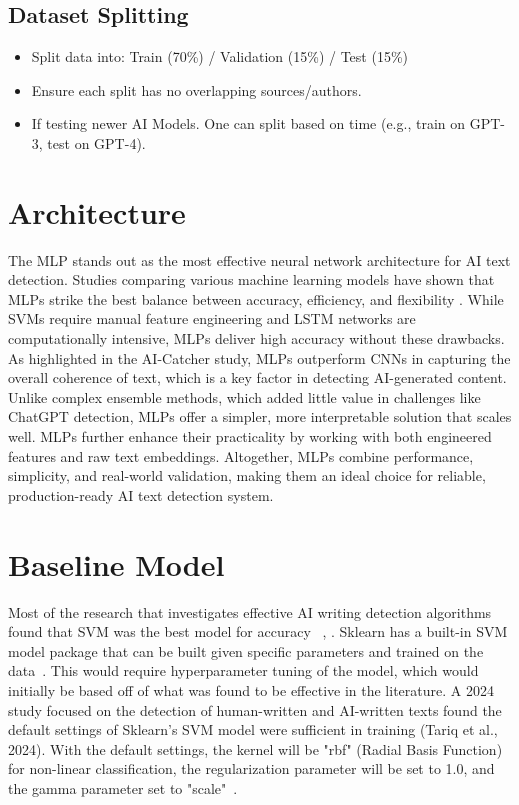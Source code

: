 \documentclass{article} %
\begin{document}
\subsection{Dataset Splitting}
\begin{itemize}
    \item Split data into: Train (70\%) / Validation (15\%) / Test (15\%)
    \item Ensure each split has no overlapping sources/authors.
    \item If testing newer AI Models. One can split based on time (e.g., train on GPT-3, test on GPT-4).
\end{itemize}

\section{Architecture}
The MLP stands out as the most effective neural network architecture for AI text detection. Studies comparing various machine learning models have shown that MLPs strike the best balance between accuracy, efficiency, and flexibility \citep{DeepLearning2024}. While SVMs require manual feature engineering and LSTM networks are computationally intensive, MLPs deliver high accuracy without these drawbacks. As highlighted in the AI-Catcher study, MLPs outperform CNNs in capturing the overall coherence of text, which is a key factor in detecting AI-generated content. Unlike complex ensemble methods, which added little value in challenges like ChatGPT detection, MLPs offer a simpler, more interpretable solution that scales well. MLPs further enhance their practicality by working with both engineered features and raw text embeddings. Altogether, MLPs combine performance, simplicity, and real-world validation, making them an ideal choice for reliable, production-ready AI text detection system.

\section{Baseline Model}
Most of the research that investigates effective AI writing detection algorithms found that SVM was the best model for accuracy ~\citep{AIessays2023}, \citep{Approaches}.
Sklearn has a built-in SVM model package that can be built given specific parameters and trained on the data~\citep{GeeksForGeeks}. This would require hyperparameter tuning of the model, which would initially be based off of what was found to be effective in the literature. A 2024 study focused on the detection of human-written and AI-written texts found the default settings of Sklearn's SVM model were sufficient in training (Tariq et al., 2024). With the default settings, the kernel will be "rbf" (Radial Basis Function) for non-linear classification, the regularization parameter will be set to 1.0, and the gamma parameter set to "scale"~\citep{Approaches}.
\end{document}
